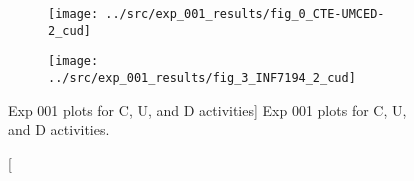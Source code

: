 \begin{figure}[h!]
    \centering

    \begin{subfigure}{.5\textwidth}
        \centering
        \texttt{[image: ../src/exp\_001\_results/fig\_0\_CTE-UMCED-2\_cud]}
        \label{subfig:exp_001_0_cud}
    \end{subfigure}%
    \begin{subfigure}{.5\textwidth}
        \centering
        \texttt{[image: ../src/exp\_001\_results/fig\_3\_INF7194\_2\_cud]}
        \label{subfig:exp_001_3_cud}
    \end{subfigure}

    \caption
        [Exp 001 plots for C, U, and D activities]
        {Exp 001 plots for C, U, and D activities.}

    \label{fig:exp_001_cud}
\end{figure}
